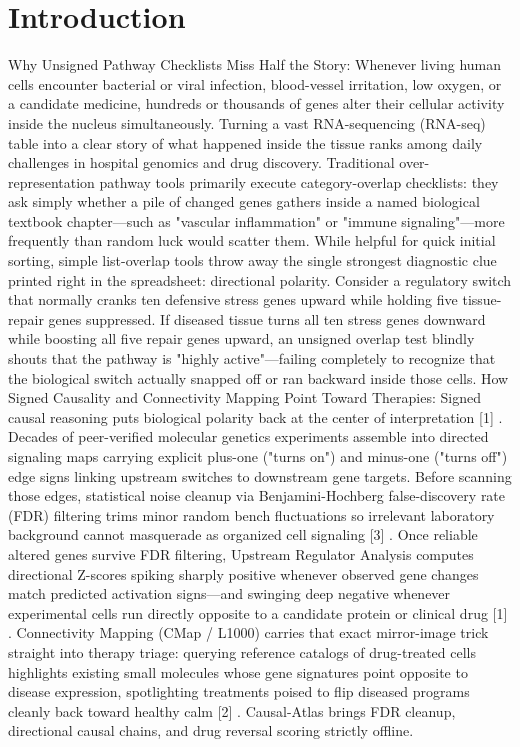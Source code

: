 \documentclass[10pt,letterpaper]{article}
\begin{document}
\section{Introduction}
Why Unsigned Pathway Checklists Miss Half the Story: Whenever living human cells encounter bacterial or viral infection, blood-vessel irritation, low oxygen, or a candidate medicine, hundreds or thousands of genes alter their cellular activity inside the nucleus simultaneously. Turning a vast RNA-sequencing (RNA-seq) table into a clear story of what happened inside the tissue ranks among daily challenges in hospital genomics and drug discovery. Traditional over-representation pathway tools primarily execute category-overlap checklists: they ask simply whether a pile of changed genes gathers inside a named biological textbook chapter---such as "vascular inflammation" or "immune signaling"---more frequently than random luck would scatter them. While helpful for quick initial sorting, simple list-overlap tools throw away the single strongest diagnostic clue printed right in the spreadsheet: directional polarity. Consider a regulatory switch that normally cranks ten defensive stress genes upward while holding five tissue-repair genes suppressed. If diseased tissue turns all ten stress genes downward while boosting all five repair genes upward, an unsigned overlap test blindly shouts that the pathway is "highly active"---failing completely to recognize that the biological switch actually snapped off or ran backward inside those cells. How Signed Causality and Connectivity Mapping Point Toward Therapies: Signed causal reasoning puts biological polarity back at the center of interpretation [1] . Decades of peer-verified molecular genetics experiments assemble into directed signaling maps carrying explicit plus-one ("turns on") and minus-one ("turns off") edge signs linking upstream switches to downstream gene targets. Before scanning those edges, statistical noise cleanup via Benjamini-Hochberg false-discovery rate (FDR) filtering trims minor random bench fluctuations so irrelevant laboratory background cannot masquerade as organized cell signaling [3] . Once reliable altered genes survive FDR filtering, Upstream Regulator Analysis computes directional Z-scores spiking sharply positive whenever observed gene changes match predicted activation signs---and swinging deep negative whenever experimental cells run directly opposite to a candidate protein or clinical drug [1] . Connectivity Mapping (CMap / L1000) carries that exact mirror-image trick straight into therapy triage: querying reference catalogs of drug-treated cells highlights existing small molecules whose gene signatures point opposite to disease expression, spotlighting treatments poised to flip diseased programs cleanly back toward healthy calm [2] . Causal-Atlas brings FDR cleanup, directional causal chains, and drug reversal scoring strictly offline.
\end{document}
